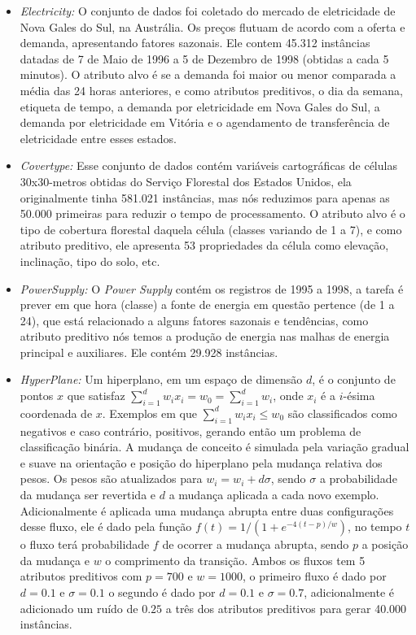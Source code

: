 \begin{itemize}
\item{\textit{Electricity:}} O conjunto de dados foi coletado do mercado de eletricidade de Nova
Gales do Sul, na Austrália. Os preços flutuam de acordo com a oferta e demanda, apresentando
fatores sazonais. Ele contem 45.312 instâncias datadas de 7 de Maio de 1996 a 5 de Dezembro de
1998 (obtidas a cada 5 minutos). O atributo alvo é se a demanda foi maior ou menor comparada a média das 24 horas anteriores, e como atributos preditivos, o dia da semana, etiqueta de tempo, a demanda por eletricidade em Nova Gales do Sul, a demanda por eletricidade em Vitória e o agendamento de transferência de eletricidade entre esses estados.

\item{\textit{Covertype:}} Esse conjunto de dados contém variáveis cartográficas de células
30x30-metros obtidas do Serviço Florestal dos Estados Unidos, ela originalmente tinha 581.021
instâncias, mas nós reduzimos para apenas as 50.000 primeiras para reduzir o tempo de
processamento. O atributo alvo é o tipo de cobertura florestal daquela célula (classes variando
de 1 a 7), e como atributo preditivo, ele apresenta 53 propriedades da célula como elevação, inclinação, tipo do solo, etc.

\item{\textit{PowerSupply:}} O \textit{Power Supply} contém os registros de 1995 a 1998, a tarefa é prever
em que hora (classe) a fonte de energia em questão pertence (de 1 a 24), que está relacionado a
alguns fatores sazonais e tendências, como atributo preditivo nós temos a produção de energia
nas malhas de energia principal e auxiliares. Ele contém 29.928 instâncias.

\item{\textit{HyperPlane:}} Um hiperplano, em um espaço de dimensão $d$, é o conjunto de pontos
$x$ que satisfaz $\sum^{d}_{i=1} w_i x_i = w_0 = \sum^{d}_{i=1} w_i$, onde $x_i$ é a $i$-ésima
coordenada de $x$. Exemplos em que $\sum^{d}_{i=1} w_i x_i \leq w_0$ são classificados como
negativos e caso contrário, positivos, gerando então um problema de classificação binária.
A mudança de conceito é simulada pela variação gradual e suave na orientação e posição do
hiperplano pela mudança relativa dos pesos. Os pesos são atualizados para $w_i = w_i + d\sigma$,
sendo $\sigma$ a probabilidade da mudança ser revertida e $d$ a mudança aplicada a cada novo
exemplo. Adicionalmente é aplicada uma mudança abrupta entre duas configurações desse fluxo,
ele é dado pela função $f(t) = 1/(1+e^{-4(t-p)/w})$, no tempo $t$ o fluxo terá probabilidade
$f$ de ocorrer a mudança abrupta, sendo $p$ a posição da mudança e $w$ o comprimento da
transição. Ambos os fluxos tem 5 atributos preditivos com $p=700$ e $w=1000$, o primeiro fluxo
é dado por $d=0.1$ e $\sigma=0.1$ o segundo é dado por $d=0.1$ e $\sigma=0.7$, adicionalmente é
adicionado um ruído de $0.25$ a três dos atributos preditivos para gerar 40.000 instâncias.


\end{itemize}
